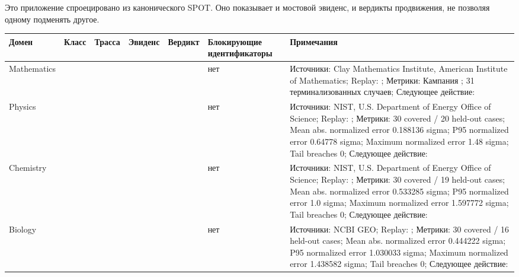 Это приложение спроецировано из канонического SPOT. Оно показывает и мостовой эвиденс, и вердикты продвижения, не позволяя одному подменять другое.

\begin{center}
\begin{tabular}{@{}L{0.14\textwidth}L{0.10\textwidth}L{0.10\textwidth}L{0.10\textwidth}L{0.08\textwidth}L{0.10\textwidth}L{0.32\textwidth}@{}}
\toprule
Домен & Класс & Трасса & Эвиденс & Вердикт & Блокирующие идентификаторы & Примечания \\
\midrule
Mathematics &  &  &  &  & нет & Источники: Clay Mathematics Institute, American Institute of Mathematics; Replay: ; Метрики: Кампания ; 31 терминализованных случаев; Следующее действие:  \\
Physics &  &  &  &  & нет & Источники: NIST, U.S. Department of Energy Office of Science; Replay: ; Метрики: 30 covered / 20 held-out cases; Mean abs. normalized error 0.188136 sigma; P95 normalized error 0.64778 sigma; Maximum normalized error 1.48 sigma; Tail breaches 0; Следующее действие:  \\
Chemistry &  &  &  &  & нет & Источники: NIST, U.S. Department of Energy Office of Science; Replay: ; Метрики: 30 covered / 19 held-out cases; Mean abs. normalized error 0.533285 sigma; P95 normalized error 1.0 sigma; Maximum normalized error 1.597772 sigma; Tail breaches 0; Следующее действие:  \\
Biology &  &  &  &  & нет & Источники: NCBI GEO; Replay: ; Метрики: 30 covered / 16 held-out cases; Mean abs. normalized error 0.444222 sigma; P95 normalized error 1.030033 sigma; Maximum normalized error 1.438582 sigma; Tail breaches 0; Следующее действие:  \\

\end{tabular}
\end{center}
